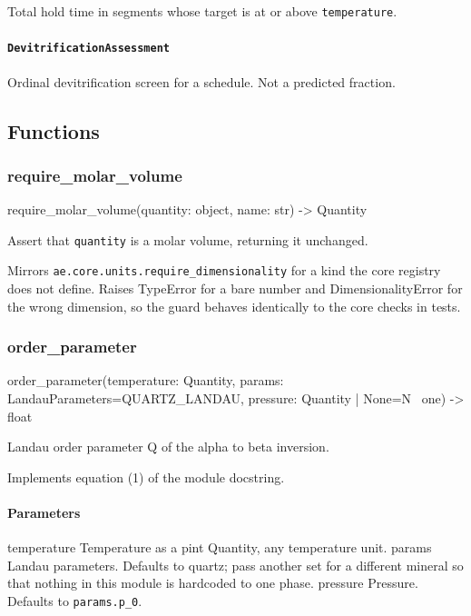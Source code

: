 \documentclass[10pt,a4paper,twoside]{report}
\begin{document}
Total hold time in segments whose target is at or above \texttt{temperature}.

\paragraph{\texttt{DevitrificationAssessment}}

Ordinal devitrification screen for a schedule. Not a predicted fraction.

\subsection*{Functions}

\subsubsection*{require\_molar\_volume}

\begin{verbatimsmall}
require_molar_volume(quantity: object, name: str) -> Quantity
\end{verbatimsmall}

Assert that \texttt{quantity} is a molar volume, returning it unchanged.

Mirrors \texttt{ae.core.units.require\_dimensionality} for a kind the core registry does not define. Raises TypeError for a bare number and DimensionalityError for the wrong dimension, so the guard behaves identically to the core checks in tests.

\subsubsection*{order\_parameter}

\begin{verbatimsmall}
order_parameter(temperature: Quantity, params: LandauParameters=QUARTZ_LANDAU, pressure: Quantity | None=N
    \ one) -> float
\end{verbatimsmall}

Landau order parameter Q of the alpha to beta inversion.

Implements equation (1) of the module docstring.

\paragraph*{Parameters}

temperature Temperature as a pint Quantity, any temperature unit. params Landau parameters. Defaults to quartz; pass another set for a different mineral so that nothing in this module is hardcoded to one phase. pressure Pressure. Defaults to \texttt{params.p\_0}.
\end{document}
